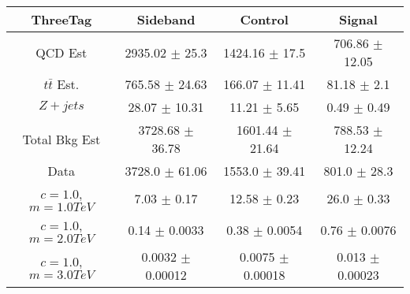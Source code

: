 \begin{footnotesize} 
\begin{tabular}{c|c|c|c} 
ThreeTag & Sideband & Control & Signal \\ 
\hline\hline 
QCD Est & 2935.02 $\pm$ 25.3 & 1424.16 $\pm$ 17.5 & 706.86 $\pm$ 12.05\\ 
$t\bar{t}$ Est.  & 765.58 $\pm$ 24.63 & 166.07 $\pm$ 11.41 & 81.18 $\pm$ 2.1\\ 
$Z+jets$ & 28.07 $\pm$ 10.31 & 11.21 $\pm$ 5.65 & 0.49 $\pm$ 0.49\\ 
Total Bkg Est & 3728.68 $\pm$ 36.78 & 1601.44 $\pm$ 21.64 & 788.53 $\pm$ 12.24\\ 
Data & 3728.0 $\pm$ 61.06 & 1553.0 $\pm$ 39.41 & 801.0 $\pm$ 28.3\\ 
$c=1.0$,$m=1.0TeV$ & 7.03 $\pm$ 0.17 & 12.58 $\pm$ 0.23 & 26.0 $\pm$ 0.33\\ 
$c=1.0$,$m=2.0TeV$ & 0.14 $\pm$ 0.0033 & 0.38 $\pm$ 0.0054 & 0.76 $\pm$ 0.0076\\ 
$c=1.0$,$m=3.0TeV$ & 0.0032 $\pm$ 0.00012 & 0.0075 $\pm$ 0.00018 & 0.013 $\pm$ 0.00023\\ 
\hline\hline 
\end{tabular} 
\end{footnotesize} 
\newline 
